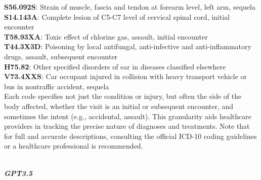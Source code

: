\documentclass[11pt]{article}
\theoremstyle{plain}
\theoremstyle{definition}
\theoremstyle{remark}
\begin{document}
{\begin{minipage}{40em}
     \textbf{S56.092S}: Strain of muscle, fascia and tendon at forearm level, left arm, sequela\\
     \textbf{S14.143A}: Complete lesion of C5-C7 level of cervical spinal cord, initial encounter\\
     \textbf{T58.93XA}: Toxic effect of chlorine gas, assault, initial encounter\\
     \textbf{T44.3X3D}: Poisoning by local antifungal, anti-infective and anti-inflammatory drugs, assault, subsequent encounter\\
     \textbf{H75.82}: Other specified disorders of ear in diseases classified elsewhere\\
     \textbf{V73.4XXS}: Car occupant injured in collision with heavy transport vehicle or bus in nontraffic accident, sequela\\

Each code specifies not just the condition or injury, but often the side of the body affected, whether the visit is an initial or subsequent encounter, and sometimes the intent (e.g., accidental, assault). This granularity aids healthcare providers in tracking the precise nature of diagnoses and treatments. Note that for full and accurate descriptions, consulting the official ICD-10 coding guidelines or a healthcare professional is recommended.


\end{minipage}} \\
\newpage
\textbf{\textit{GPT3.5}}\\
\end{document}
